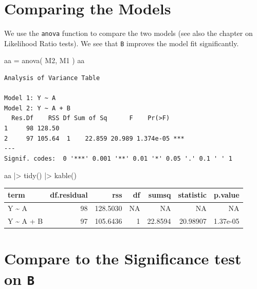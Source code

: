 \documentclass[
  letterpaper,
  DIV=11,
  numbers=noendperiod]{scrreprt}
\newenvironment{Shaded}{\begin{snugshade}}{\end{snugshade}}
\newcommand{\FunctionTok}[1]{\textcolor[rgb]{0.02,0.16,0.49}{#1}}
\newcommand{\NormalTok}[1]{\textcolor[rgb]{0.00,0.44,0.13}{#1}}
\newcommand{\OtherTok}[1]{\textcolor[rgb]{0.00,0.44,0.13}{#1}}
\newcommand{\SpecialCharTok}[1]{\textcolor[rgb]{0.25,0.44,0.63}{#1}}
\begin{document}
\hypertarget{comparing-the-models}{%
\section{Comparing the Models}\label{comparing-the-models}}

We use the \texttt{anova} function to compare the two models (see also
the chapter on Likelihood Ratio tests). We see that \texttt{B} improves
the model fit significantly.

\begin{Shaded}
\begin{Highlighting}[]
\NormalTok{aa }\OtherTok{=} \FunctionTok{anova}\NormalTok{( M2, M1 )}
\NormalTok{aa}
\end{Highlighting}
\end{Shaded}

\begin{verbatim}
Analysis of Variance Table

Model 1: Y ~ A
Model 2: Y ~ A + B
  Res.Df    RSS Df Sum of Sq      F    Pr(>F)    
1     98 128.50                                  
2     97 105.64  1    22.859 20.989 1.374e-05 ***
---
Signif. codes:  0 '***' 0.001 '**' 0.01 '*' 0.05 '.' 0.1 ' ' 1
\end{verbatim}

\begin{Shaded}
\begin{Highlighting}[]
\NormalTok{aa }\SpecialCharTok{|\textgreater{}} 
  \FunctionTok{tidy}\NormalTok{() }\SpecialCharTok{|\textgreater{}} 
  \FunctionTok{kable}\NormalTok{()}
\end{Highlighting}
\end{Shaded}

\begin{longtable}[]{@{}lrrrrrr@{}}
\toprule\noalign{}
term & df.residual & rss & df & sumsq & statistic & p.value \\
\midrule\noalign{}
\endhead
\bottomrule\noalign{}
\endlastfoot
Y \textasciitilde{} A & 98 & 128.5030 & NA & NA & NA & NA \\
Y \textasciitilde{} A + B & 97 & 105.6436 & 1 & 22.8594 & 20.98907 &
1.37e-05 \\
\end{longtable}

\hypertarget{compare-to-the-significance-test-on-b}{%
\section{\texorpdfstring{Compare to the Significance test on
\texttt{B}}{Compare to the Significance test on B}}\label{compare-to-the-significance-test-on-b}}
\end{document}
